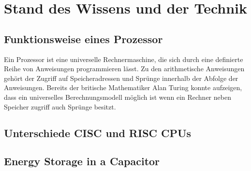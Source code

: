 \chapter{Stand des Wissens und der Technik}
\section{Funktionsweise eines Prozessor}

Ein Prozessor ist eine universelle Rechnermaschine, die sich durch eine definierte Reihe von Anweisungen programmieren lässt. Zu den arithmetische Anweisungen gehört der Zugriff auf Speicheradressen und Sprünge innerhalb der Abfolge der Anweisungen.
Bereits der britische Mathematiker Alan Turing konnte aufzeigen, dass ein universelles Berechnungsmodell möglich ist wenn ein Rechner neben Speicher zugriff auch Sprünge besitzt\cite{Hoffmann2014l}.




\section{Unterschiede CISC und RISC CPUs}



\section{Energy Storage in a Capacitor}
